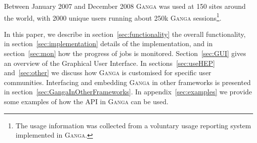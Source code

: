 \documentclass{elsart}
\def\ganga {\textsc{Ganga}\xspace}
\begin{document}
\begin{linenumbers}
Between January 2007 and December 2008 \ganga was
used at 150 sites around the world, with 2000 unique users running about 250k %
\ganga sessions\footnote{The usage information was collected from a voluntary
  usage reporting system implemented in \ganga.}.

In this paper, we describe in section~\ref{sec:functionality} the
overall functionality, in section~\ref{sec:implementation} details of
the implementation, and in section~\ref{sec:mon} how the progress of
jobs is monitored. Section~\ref{sec:GUI} gives an overview of the
Graphical User Interface.  In sections~\ref{sec:useHEP}
and~\ref{sec:other} we discuss how \ganga is customised for specific
user communities. Interfacing and embedding \ganga in other frameworks
is presented in section~\ref{sec:GangaInOtherFrameworks}. In
appendix~\ref{sec:examples} we provide some examples of how the API in
\ganga can be used.


\end{linenumbers}
\end{document}
